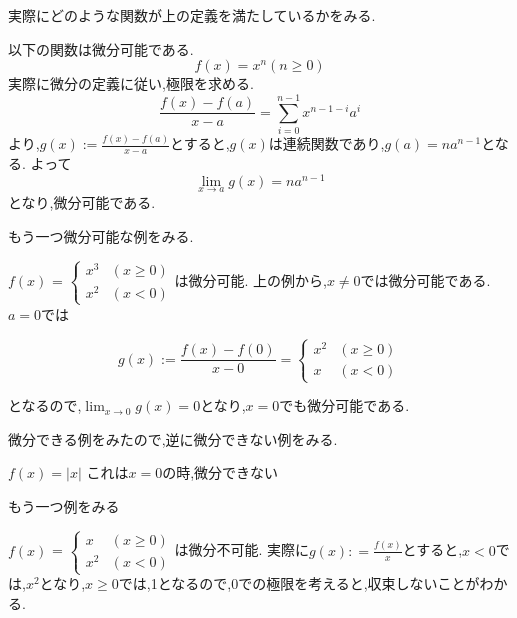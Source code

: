 \documentclass{ujarticle}
\begin{document}
実際にどのような関数が上の定義を満たしているかをみる.


\begin{epl}
以下の関数は微分可能である.
\begin{equation*}
f(x) = x^n (n \ge 0)
\end{equation*}
実際に微分の定義に従い,極限を求める.
\begin{equation*}
\frac{f(x) - f(a)}{x-a}= \sum_{i=0}^{n-1} x^{n-1-i}a^i
\end{equation*}
より,$g(x):=\frac{f(x) - f(a)}{x-a}$とすると,$g(x)$は連続関数であり,$g(a) = na^{n-1}$となる.
よって
\begin{equation*}
\lim_{x \to a} g(x) = na^{n-1}
\end{equation*}
となり,微分可能である.
\end{epl}


もう一つ微分可能な例をみる.

\begin{epl}
$f(x)$ = $
\begin{cases}
x^3 & (x \ge 0)\\
x^2 & (x < 0)
\end{cases}
$は微分可能.
上の例から,$x \neq 0$では微分可能である.
$a = 0$では

\begin{equation*}
g(x) := \frac{f(x) -f(0)}{x - 0} =
\begin{cases}
x^2 & (x \ge 0)\\
x & (x < 0)
\end{cases}
\end{equation*}

となるので,$\displaystyle \lim_{x \to 0} g(x) = 0$となり,$x = 0$でも微分可能である.
\end{epl}


微分できる例をみたので,逆に微分できない例をみる.


\begin{epl}
$f(x) = |x|$
これは$x=0$の時,微分できない
\end{epl}


もう一つ例をみる


\begin{epl}
$f(x)$ = $
\begin{cases}
x & (x \ge 0)\\
x^2 & (x < 0)
\end{cases}
$は微分不可能.
実際に$g(x): = \frac{f(x)}{x}$とすると,$x < 0$では,$x^2$となり,$x \ge 0$では,1となるので,$0$での極限を考えると,収束しないことがわかる.
\end{epl}
\end{document}
